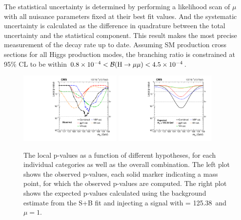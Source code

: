 The statistical uncertainty is determined by performing a likelihood scan of $\mu$ with all nuisance parameters fixed at their best fit values.
And the systematic uncertainty is calculated as the difference in quadrature between the total uncertainty and the statistical component.
This result makes the most precise measurement of the \hmm decay rate up to date.
Assuming SM production cross sections for all Higgs production modes, 
the \hmm branching ratio is constrained at 95\% CL to be within $0.8 \times 10^{-4} < {\mathcal{B}(\mathrm{H} \to \mu\mu)} < 4.5 \times 10^{-4}$.

\begin{figure}[!htb]
    \centering
    \includegraphics[width=0.45\textwidth]{pics/results/p-value_obs.pdf}
    \includegraphics[width=0.45\textwidth]{pics/results/p-value_exp.pdf}
    \caption{The local p-values as a function of different \mh hypotheses, 
             for each individual categories as well as the overall combination.
             The left plot shows the observed p-values, 
             each solid marker indicating a mass point, for which the observed p-values are computed.
             The right plot shows the expected p-values calculated using the background estimate from the S+B fit 
             and injecting a signal with \mh = 125.38~\GeV and $\mu = 1$.}
    \label{fig:p_value_scan}
\end{figure}

